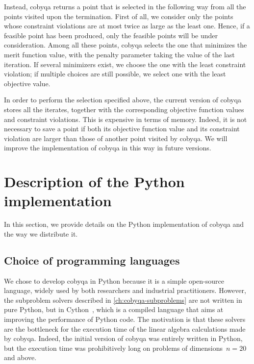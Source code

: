 Instead, \gls{cobyqa} returns a point that is selected in the following way from all the points visited upon the termination.
First of all, we consider only the points whose constraint violations are at most twice as large as the least one.
Hence, if a feasible point has been produced, only the feasible points will be under consideration.
Among all these points, \gls{cobyqa} selects the one that minimizes the merit function value, with the penalty parameter taking the value of the last iteration.
If several minimizers exist, we choose the one with the least constraint violation; 
if multiple choices are still possible, we select one with the least objective value.

In order to perform the selection specified above, the current version of \gls{cobyqa} stores all the iterates, together with the corresponding objective function values and constraint violations.
This is expensive in terms of memory.
Indeed, it is not necessary to save a point if both its objective function value and its constraint violation are larger than those of another point visited by \gls{cobyqa}.
We will improve the implementation of \gls{cobyqa} in this way in future versions.

\section{Description of the Python implementation}
\label{sec:python-implementation}

In this section, we provide details on the Python implementation of \gls{cobyqa} and the way we distribute it.

\subsection{Choice of programming languages}

We chose to develop \gls{cobyqa} in Python because it is a simple open-source language, widely used by both researchers and industrial practitioners.
However, the subproblem solvers described in \cref{ch:cobyqa-subproblems} are not written in pure Python, but in Cython~\cite{Behnel_Etal_2011}, which is a compiled language that aims at improving the performance of Python code.
The motivation is that these solvers are the bottleneck for the execution time of the linear algebra calculations made by \gls{cobyqa}.
Indeed, the initial version of \gls{cobyqa} was entirely written in Python, but the execution time was prohibitively long on problems of dimensions~$n = 20$ and above.


